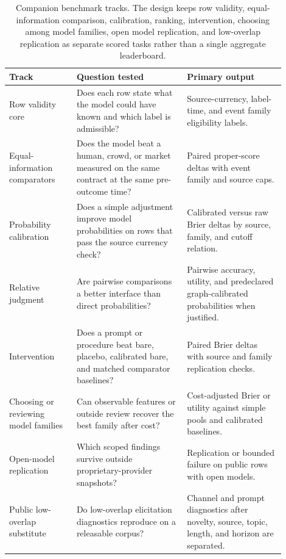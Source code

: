 \documentclass[11pt]{article}
\begin{document}
\begin{table}[htbp]
\centering
\small
\begin{tabular}{L{0.22\linewidth} L{0.36\linewidth} L{0.32\linewidth}}
\toprule
Track & Question tested & Primary output \\
\midrule
Row validity core & Does each row state what the model could have known and which label is admissible? & Source-currency, label-time, and event family eligibility labels. \\
Equal-information comparators & Does the model beat a human, crowd, or market measured on the same contract at the same pre-outcome time? & Paired proper-score deltas with event family and source caps. \\
Probability calibration & Does a simple adjustment improve model probabilities on rows that pass the source currency check? & Calibrated versus raw Brier deltas by source, family, and cutoff relation. \\
Relative judgment & Are pairwise comparisons a better interface than direct probabilities? & Pairwise accuracy, utility, and predeclared graph-calibrated probabilities when justified. \\
Intervention & Does a prompt or procedure beat bare, placebo, calibrated bare, and matched comparator baselines? & Paired Brier deltas with source and family replication checks. \\
Choosing or reviewing model families & Can observable features or outside review recover the best family after cost? & Cost-adjusted Brier or utility against simple pools and calibrated baselines. \\
Open-model replication & Which scoped findings survive outside proprietary-provider snapshots? & Replication or bounded failure on public rows with open models. \\
Public low-overlap substitute & Do low-overlap elicitation diagnostics reproduce on a releasable corpus? & Channel and prompt diagnostics after novelty, source, topic, length, and horizon are separated. \\
\bottomrule
\end{tabular}
\caption{Companion benchmark tracks. The design keeps row validity, equal-information comparison, calibration, ranking, intervention, choosing among model families, open model replication, and low-overlap replication as separate scored tasks rather than a single aggregate leaderboard.}
\label{tab:benchmark-blueprint}
\end{table}
\end{document}
